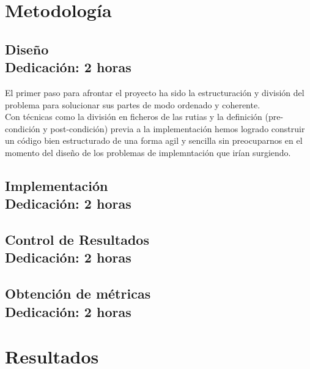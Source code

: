 \documentclass[12pt,letterpaper]{article}
\begin{document}
\clearpage
\section{Metodología}

\subsection{Diseño\\ {\footnotesize Dedicación: 2 horas}}

El primer paso para afrontar el proyecto ha sido la estructuración
y división del problema para solucionar sus partes de modo ordenado
y coherente.\\
Con técnicas como la división en ficheros de las rutias y la definición
(pre-condición y post-condición) previa a la implementación hemos logrado
construir un código bien estructurado de una forma agil y sencilla
sin preocuparnos en el momento del diseño de los problemas de implemntación
que irían surgiendo.\\

\subsection{Implementación\\ {\footnotesize Dedicación: 2 horas}}

\subsection{Control de Resultados\\ {\footnotesize Dedicación: 2 horas}}

\subsection{Obtención de métricas\\ {\footnotesize Dedicación: 2 horas}}



\section{Resultados}
\end{document}
